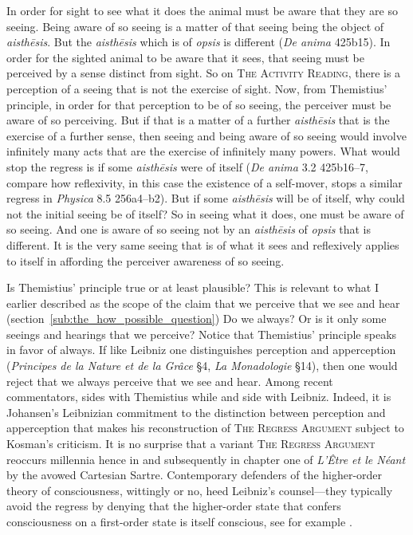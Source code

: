 In order for sight to see what it does the animal must be aware that they are so seeing. Being aware of so seeing is a matter of that seeing being the object of \emph{aisthēsis}. But the \emph{aisthēsis} which is of \emph{opsis} is different (\emph{De anima} 425b15). In order for the sighted animal to be aware that it sees, that seeing must be perceived by a sense distinct from sight. So on \textsc{The Activity Reading}, there is a perception of a seeing that is not the exercise of sight. Now, from Themistius' principle, in order for that perception to be of so seeing, the perceiver must be aware of so perceiving. But if that is a matter of a further \emph{aisthēsis} that is the exercise of a further sense, then seeing and being aware of so seeing would involve infinitely many acts that are the exercise of infinitely many powers. What would stop the regress is if some \emph{aisthēsis} were of itself (\emph{De anima} 3.2 425b16–7, compare how reflexivity, in this case the existence of a self-mover, stops a similar regress in \emph{Physica} 8.5 256a4–b2). But if some \emph{aisthēsis} will be of itself, why could not the initial seeing be of itself? So in seeing what it does, one must be aware of so seeing. And one is aware of so seeing not by an \emph{aisthēsis} of \emph{opsis} that is different. It is the very same seeing that is of what it sees and reflexively applies to itself in affording the perceiver awareness of so seeing. 

Is Themistius' principle true or at least plausible? This is relevant to what I earlier described as the scope of the claim that we perceive that we see and hear (section~\ref{sub:the_how_possible_question}) Do we always? Or is it only some seeings and hearings that we perceive? Notice that Themistius' principle speaks in favor of always. If like Leibniz one distinguishes perception and apperception (\emph{Principes de la Nature et de la Grâce} §4, \emph{La Monadologie} §14), then one would reject that we always perceive that we see and hear. Among recent commentators, \citet{caston02} sides with Themistius while \citet{Johansen:2005hz} and \citet{McCabe:2007jb} side with Leibniz. Indeed, it is Johansen's \citeyearpar{Johansen:2005hz} Leibnizian commitment to the distinction between perception and apperception that makes his reconstruction of \textsc{The Regress Argument} subject to Kosman's \citeyearpar{Kosman:2005ff} criticism. It is no surprise that a variant \textsc{The Regress Argument} reoccurs millennia hence in \citet[2.2]{Brentano:1874aa} and subsequently in chapter one of \emph{L'Être et le Néant} by the avowed Cartesian Sartre. Contemporary defenders of the higher-order theory of consciousness, wittingly or no, heed Leibniz's counsel—they typically avoid the regress by denying that the higher-order state that confers consciousness on a first-order state is itself conscious, see for example \citet{Rosenthal:1986jt}.

